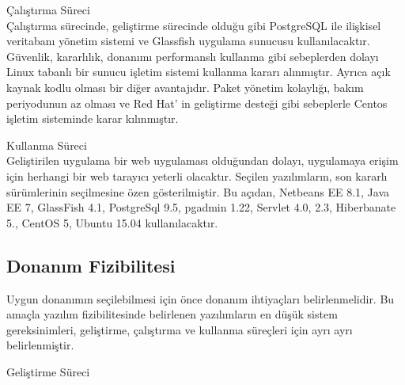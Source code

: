 Çalıştırma Süreci\\
Çalıştırma sürecinde, geliştirme sürecinde olduğu gibi PostgreSQL ile ilişkisel
veritabanı yönetim sistemi ve Glassfish uygulama sunucusu kullanılacaktır. Güvenlik,
kararlılık, donanımı performanslı kullanma gibi sebeplerden dolayı\cite{serverKarsilastirma} Linux tabanlı
bir sunucu işletim sistemi kullanma kararı alınmıştır. Ayrıca açık kaynak kodlu olması
bir diğer avantajıdır. Paket yönetim kolaylığı, bakım periyodunun az olması ve Red Hat'
in geliştirme desteği gibi sebeplerle\cite{centos} Centos işletim sisteminde karar kılınmıştır.

Kullanma Süreci\\
Geliştirilen uygulama bir web uygulaması olduğundan dolayı, uygulamaya erişim için
herhangi bir web tarayıcı yeterli olacaktır.
Seçilen yazılımların, son kararlı sürümlerinin seçilmesine özen gösterilmiştir. Bu
açıdan, Netbeans EE 8.1, Java EE 7, GlassFish 4.1, PostgreSql 9.5, pgadmin 1.22,
Servlet 4.0, 2.3, Hiberbanate 5., CentOS 5, Ubuntu 15.04 kullanılacaktır.

\subsection{Donanım Fizibilitesi}
Uygun donanımın seçilebilmesi için önce donanım ihtiyaçları belirlenmelidir. Bu
amaçla yazılım fizibilitesinde belirlenen yazılımların en düşük sistem gereksinimleri,
geliştirme, çalıştırma ve kullanma süreçleri için ayrı ayrı belirlenmiştir.

Geliştirme Süreci\\

